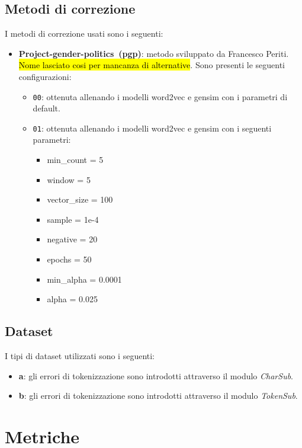 \documentclass[12pt]{article}
\begin{document}
\subsection{Metodi di correzione}
I metodi di correzione usati sono i seguenti:
\begin{itemize}
	\newcommand{\pgp}{pgp}
	\newcommand{\pgpfull}{Project-gender-politics}
	\item \textbf{\pgpfull\ (pgp)}: metodo sviluppato da Francesco Periti. \hl{Nome lasciato cosi per mancanza di alternative}. Sono presenti le seguenti configurazioni:
	\begin{itemize}
		\item \texttt{00}: ottenuta allenando i modelli word2vec e gensim con i parametri di default.
		\item \texttt{01}: ottenuta allenando i modelli word2vec e gensim con i seguenti parametri:
		\begin{itemize}
			\item min\_count = 5
			\item window = 5
			\item vector\_size = 100
			\item sample = 1e-4
			\item negative = 20
			\item epochs = 50
			\item min\_alpha = 0.0001
			\item alpha = 0.025
		\end{itemize}
	\end{itemize}
\end{itemize}


	
\subsection{Dataset}
	
I tipi di dataset utilizzati sono i seguenti:
\begin{itemize}
\item \textbf{a}: gli errori di tokenizzazione sono introdotti attraverso il modulo \textit{CharSub}.
\item \textbf{b}: gli errori di tokenizzazione sono introdotti attraverso il modulo \textit{TokenSub}.
\end{itemize}


\section{Metriche}
\end{document}

